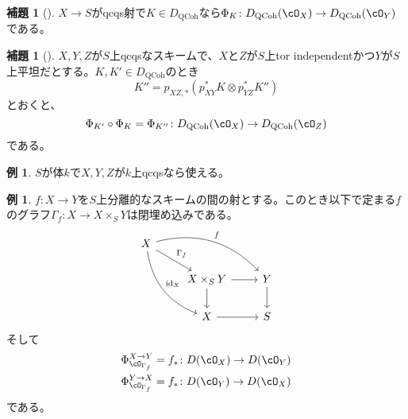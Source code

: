\documentclass[uplatex, a4paper, dvipdfmx]{jsarticle}
\theoremstyle{definition}
\newtheorem{lemma}[theorem]{補題}
\newtheorem{example}[theorem]{例}
\DeclareMathOperator{\id}{\mathrm{id}}
\DeclareMathOperator{\QCoh}{\mathrm{QCoh}}
\begin{document}
\begin{lemma}[{\cite[\href{https://stacks.math.columbia.edu/tag/0FYR}{Tag 0FYR}]{stacks-project}}]
    $X \to S$がqcqs射で$K \in D_{\QCoh}$なら$\Phi_K \colon D_{\QCoh}(\cO_X) \to D_{\QCoh}(\cO_Y)$である。
\end{lemma}
\begin{lemma}[{\cite[\href{https://stacks.math.columbia.edu/tag/0FYS}{Tag 0FYS}]{stacks-project}}]
    $X, Y, Z$が$S$上qcqsなスキームで、$X$と$Z$が$S$上tor independentかつ$Y$が$S$上平坦だとする。$K, K' \in D_{\QCoh}$のとき
    \begin{equation}
        K'' = p_{XZ,*}(p_{XY}^*K \otimes p_{YZ}^*K'')
    \end{equation}
    とおくと、
    \begin{equation}
        \Phi_{K'} \circ \Phi_K = \Phi_{K''}\colon D_{\QCoh}(\cO_X) \to D_{\QCoh}(\cO_Z)
    \end{equation}
    である。
\end{lemma}
\begin{example}\label{ex:composition-of-Fourier-Mukai-over-field}
    $S$が体$k$で$X, Y, Z$が$k$上qcqsなら使える。
\end{example}
\begin{example}\label{ex:push-pull-as-Fourier-Mukai}
    $f \colon X \to Y$を$S$上分離的なスキームの間の射とする。このとき以下で定まる$f$のグラフ$\Gamma_f \colon X \to X \times_S Y$は閉埋め込みである。
    \[
        \begin{tikzcd}
            X \ar[rd, "\Gamma_f"] \ar[rdd, bend right, "\id_X"] \ar[rrd, bend left, "f"]& & \\
            & X \times_S Y \ar[r] \ar[d] & Y \ar[d]\\
            & X            \ar[r]        & S
        \end{tikzcd}
    \]
    そして
    \begin{align}
        \Phi_{\cO_{\Gamma_f}}^{X \to Y} = f_* & \colon D(\cO_X) \to D(\cO_Y) \\
        \Phi_{\cO_{\Gamma_f}}^{Y \to X} = f_* & \colon D(\cO_Y) \to D(\cO_X)
    \end{align}
    である。
\end{example}
\end{document}
